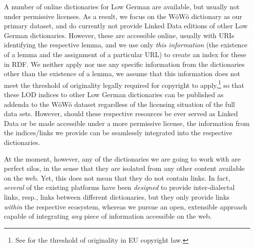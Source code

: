 \documentclass[11pt]{article}
\begin{document}
\begin{enumerate}
A number of online dictionaries for Low German are available, but usually not under permissive licenses. As a result, we focus on the WöWö dictionary as our primary dataset, and do currently not provide Linked Data editions of other Low German dictionaries. However, these are accessible online, usually with URIs identifying the respective lemma, and we use only \emph{this information} (the existence of a lemma and the assignment of a particular URL) to create an index for these in RDF. We neither apply nor use any specific information from the dictionaries other than the existence of a lemma, we assume that this information does not meet the threshold of originality legally required for copyright to apply,\footnote{See \citet{Margoni2016} for the threshold of originality in EU copyright law.}
so that these LOD indices to other Low German dictionaries can be published as addenda to the WöWö dataset regardless of the licensing situation of the full data sets. However, should these respective resources be ever served as Linked Data or be made accessible under a more permissive license, the information from the indices/links we provide can be seamlessly integrated into the respective dictionaries.

At the moment, however, any of the dictionaries we are going to work with are perfect silos, in the sense that they are isolated from any other content available on the web. Yet, this does not mean that they do not contain links. In fact, \emph{several} of the existing platforms have been \emph{designed} to provide inter-dialectal links, resp., links between different dictionaries, but they only provide links \emph{within} the respective ecosystem, whereas we pursue an open, extensible approach capable of integrating \emph{any} piece of information accessible on the web. 


\end{enumerate}
\end{document}

